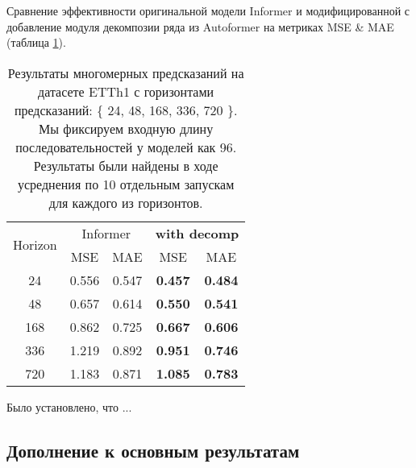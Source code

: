 Сравнение эффективности оригинальной модели Informer и модифицированной
с добавление модуля декомпозии ряда из Autoformer 
на метриках MSE \& MAE (таблица \ref{tab:etth1-decomp}).

\begin{table}[!ht]
    \centering
    \begin{tabular}{c  cc  cc}
    \toprule
    \multirow{2}{*}{{Horizon}} 
      & \multicolumn{2}{c}{{Informer}} 
      & \multicolumn{2}{c}{\textbf{with decomp}} \\
    \cmidrule(lr){2-3} \cmidrule(lr){4-5}
      & {MSE} & {MAE} 
      & {MSE} & {MAE} \\
    \midrule
    24   & 0.556 & 0.547 & \textbf{0.457} & \textbf{0.484} \\
    48   & 0.657 & 0.614 & \textbf{0.550} & \textbf{0.541} \\
    168  & 0.862 & 0.725 & \textbf{0.667} & \textbf{0.606} \\
    336  & 1.219 & 0.892 & \textbf{0.951} & \textbf{0.746} \\
    720  & 1.183 & 0.871 & \textbf{1.085} & \textbf{0.783} \\
    \bottomrule
    \end{tabular}
    \caption{Результаты многомерных предсказаний на датасете ETTh1 с 
    горизонтами предсказаний: \{ 24, 48, 168, 336, 720 \}. 
    Мы фиксируем входную длину последовательностей у моделей как 96.
    Результаты были найдены в ходе усреднения по 10 отдельным запускам 
    для каждого из горизонтов.}
    \label{tab:etth1-decomp}
\end{table}

Было установлено, что {\color{red} ...}



\subsection{Дополнение к основным результатам}

